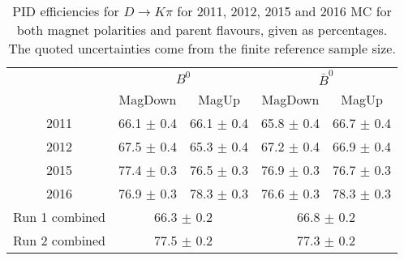 \begin{table}
    \centering
    \begin{tabular}{ccccc}
        \toprule
        & \multicolumn{2}{c}{$B^0$} &  \multicolumn{2}{c}{$\bar{B}^0$}\\
        & MagDown & MagUp & MagDown & MagUp\\
        \midrule
2011 & 66.1 $\pm$ 0.4 & 66.1 $\pm$ 0.4 & 65.8 $\pm$ 0.4 & 66.7 $\pm$ 0.4 \\
2012 & 67.5 $\pm$ 0.4 & 65.3 $\pm$ 0.4 & 67.2 $\pm$ 0.4 & 66.9 $\pm$ 0.4 \\
2015 & 77.4 $\pm$ 0.3 & 76.5 $\pm$ 0.3 & 76.9 $\pm$ 0.3 & 76.7 $\pm$ 0.3 \\
2016 & 76.9 $\pm$ 0.3 & 78.3 $\pm$ 0.3 & 76.6 $\pm$ 0.3 & 78.3 $\pm$ 0.3 \\
        \midrule
Run 1 combined & \multicolumn{2}{c}{66.3 $\pm$ 0.2} & \multicolumn{2}{c}{66.8 $\pm$ 0.2} \\
Run 2 combined & \multicolumn{2}{c}{77.5 $\pm$ 0.2} & \multicolumn{2}{c}{77.3 $\pm$ 0.2} \\
        \bottomrule
    \end{tabular}
    \caption{PID efficiencies for $D \to K\pi$ for 2011, 2012, 2015 and 2016 MC for both magnet polarities and parent flavours, given as percentages. The quoted  uncertainties come from the finite reference sample size.}
\label{tab:PID_efficiency_Kpi}
\end{table}
